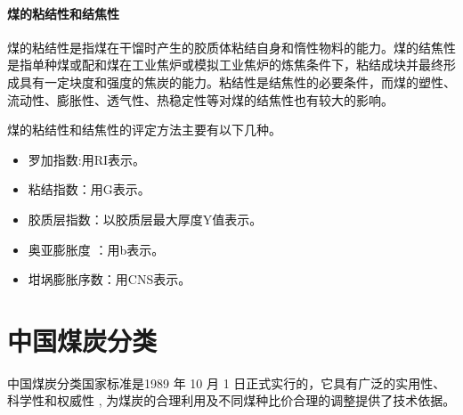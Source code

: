 \documentclass[10pt,openany]{ctexbook}
\begin{document}
\paragraph{煤的粘结性和结焦性}
煤的粘结性是指煤在干馏时产生的胶质体粘结自身和惰性物料的能力。煤的结焦性是指单种煤或配和煤在工业焦炉或模拟工业焦炉的炼焦条件下，粘结成块并最终形成具有一定块度和强度的焦炭的能力。粘结性是结焦性的必要条件，而煤的塑性、流动性、膨胀性、透气性、热稳定性等对煤的结焦性也有较大的影响。\par
煤的粘结性和结焦性的评定方法主要有以下几种。
\begin{itemize}
\item  罗加指数:用RI表示。
\item  粘结指数：用G表示。
\item  胶质层指数：以胶质层最大厚度Y值表示。
\item 奥亚膨胀度 ：用b表示。
\item  坩埚膨胀序数：用CNS表示。
\end{itemize}

\section{中国煤炭分类}
中国煤炭分类国家标准是1989 年 10 月 1 日正式实行的，它具有广泛的实用性、科学性和权威性 , 为煤炭的合理利用及不同煤种比价合理的调整提供了技术依据。
\end{document}
